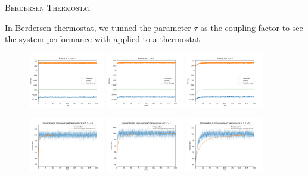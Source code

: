 \documentclass{article}
\begin{document}
\begin{spacing}{1}
\vspace{1.5em}
\textsc{\Large Berdersen Thermostat}

In Berdersen thermostat, we tunned the parameter $\tau$ as the coupling factor to see the system performance with applied to a thermostat.


\begin{figure}[htbp]
  \centering
  \includegraphics[width=0.3\textwidth]{berendsen/tau05/test/Energy.png}
  \includegraphics[width=0.3\textwidth]{berendsen/tau1/test/Energy.png}
  \includegraphics[width=0.3\textwidth]{berendsen/tau5/test/Energy.png}
\end{figure}

\begin{figure}[htbp]
  \centering
  \includegraphics[width=0.3\textwidth]{berendsen/tau05/test/T&aT.png}
  \includegraphics[width=0.3\textwidth]{berendsen/tau1/test/T&aT.png}
  \includegraphics[width=0.3\textwidth]{berendsen/tau5/test/T&aT.png}
\end{figure}


\end{spacing}
\end{document}
